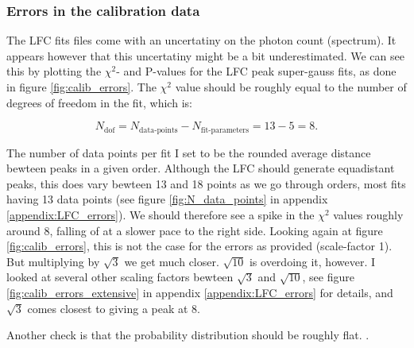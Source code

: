     \vspace{0.5cm}




    \subsubsection{Errors in the calibration data}

    The LFC fits files come with an uncertatiny on the photon count (spectrum). It appears however that this uncertatiny might be a bit underestimated. We can see this by plotting the $\chi^2$- and P-values for the LFC peak super-gauss fits, as done in figure \ref{fig:calib_errors}. The $\chi^2$ value should be roughly equal to the number of degrees of freedom in the fit, which is: 

    \begin{equation}
        \label{eq:ndof}
        N_\text{dof} = N_\text{data-points} - N_\text{fit-parameters} =  13 - 5 = 8.
    \end{equation}

    The number of data points per fit I set to be the rounded average distance bewteen peaks in a given order. Although the LFC should generate equadistant peaks, this does vary bewteen 13 and 18 points as we go through orders, most fits having 13 data points (see figure \ref{fig:N_data_points} in appendix \ref{appendix:LFC_errors}). We should therefore see a spike in the $\chi^2$ values roughly around 8, falling of at a slower pace to the right side. Looking again at figure \ref{fig:calib_errors}, this is not the case for the errors as provided (scale-factor 1). But multiplying by $\sqrt{3}$ we get much closer. $\sqrt{10}$ is overdoing it, however. I looked at several other scaling factors bewteen $\sqrt{3}$ and $\sqrt{10}$, see figure \ref{fig:calib_errors_extensive} in appendix \ref{appendix:LFC_errors} for details, and $\sqrt{3}$ comes closest to giving a peak at 8.
    
    Another check is that the probability distribution should be roughly flat. .
    
